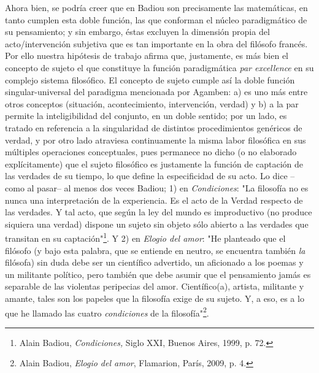 \documentclass{book}
\begin{document}
Ahora bien, se podría creer que en Badiou son precisamente las
matemáticas, en tanto cumplen esta doble función, las que conforman el
núcleo paradigmático de su pensamiento; y sin embargo, éstas excluyen la
dimensión propia del acto/intervención subjetiva que es tan importante
en la obra del filósofo francés. Por ello nuestra hipótesis de trabajo
afirma que, justamente, es más bien el concepto de sujeto el que
constituye la función paradigmática \emph{par excellence} en su complejo
sistema filosófico. El concepto de sujeto cumple así la doble función
singular-universal del paradigma mencionada por Agamben: a) es uno más
entre otros conceptos (situación, acontecimiento, intervención, verdad)
y b) a la par permite la inteligibilidad del conjunto, en un doble
sentido; por un lado, es tratado en referencia a la singularidad de
distintos procedimientos genéricos de verdad, y por otro lado atraviesa
continuamente la misma labor filosófica en sus múltiples operaciones
conceptuales, pues permanece no dicho (o no elaborado explícitamente)
que el sujeto filosófico es justamente la función de captación de las
verdades de su tiempo, lo que define la especificidad de su acto. Lo
dice --como al pasar-- al menos dos veces Badiou; 1) en
\emph{Condiciones}: "La filosofía no es nunca una interpretación de la
experiencia. Es el acto de la Verdad respecto de las verdades. Y tal
acto, que según la ley del mundo es improductivo (no produce siquiera
una verdad) dispone un sujeto sin objeto sólo abierto a las verdades que
transitan en su captación"\footnote{Alain Badiou, \emph{Condiciones,}
  Siglo XXI, Buenos Aires, 1999, p. 72.}. Y 2) en \emph{Elogio del
amor}: "He planteado que el filósofo (y bajo esta palabra, que se
entiende en neutro, se encuentra también \emph{la} filósofa) sin duda
debe ser un científico advertido, un aficionado a los poemas y un
militante político, pero también que debe asumir que el pensamiento
jamás es separable de las violentas peripecias del amor. Científico(a),
artista, militante y amante, tales son los papeles que la filosofía
exige de su sujeto. Y, a eso, es a lo que he llamado las cuatro
\emph{condiciones} de la filosofía"\footnote{Alain Badiou, \emph{Elogio
  del amor}, Flamarion, París, 2009, p. 4.}.
\end{document}
